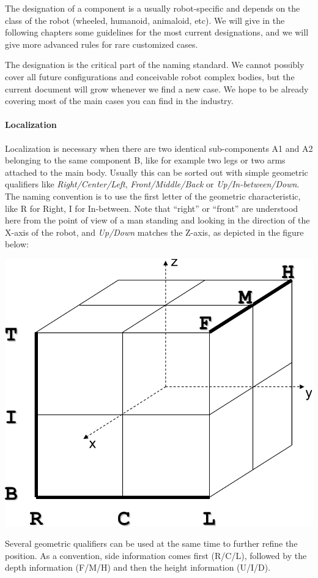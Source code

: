 The designation of a component is a usually robot-specific and depends
on the class of the robot (wheeled, humanoid, animaloid, etc). We will
give in the following chapters some guidelines for the most current
designations, and we will give more advanced rules for rare customized
cases.


The designation is the critical part of the naming standard. We cannot
possibly cover all future configurations and conceivable robot complex
bodies, but the current document will grow whenever we find a new
case.  We hope to be already covering most of the main cases you can
find in the industry.

\paragraph{Localization}

Localization is necessary when there are two identical sub-components
A1 and A2 belonging to the same component B, like for example two legs
or two arms attached to the main body. Usually this can be sorted out
with simple geometric qualifiers like \textit{Right/Center/Left},
\textit{Front/Middle/Back} or \textit{Up/In-between/Down}. The naming
convention is to use the first letter of the geometric characteristic,
like R for Right, I for In-between.  Note that ``right'' or ``front'' are
understood here from the point of view of a man standing and looking
in the direction of the X-axis of the robot, and \textit{Up/Down}
matches the Z-axis, as depicted in the figure below:

\begin{center}
  \includegraphics[width=.5\linewidth]{img/cube}
\end{center}

Several geometric qualifiers can be used at the same time to further
refine the position. As a convention, side information comes first
(R/C/L), followed by the depth information (F/M/H) and then the height
information (U/I/D).

